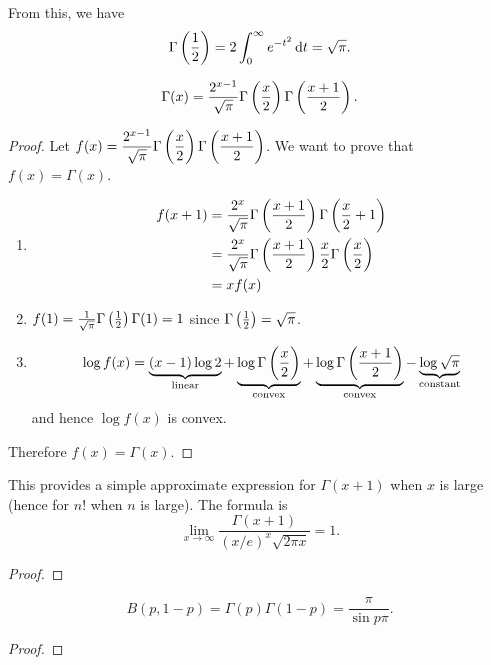 From this, we have
\[\Gamma\left(\frac{1}{2}\right)=2\int_0^\infty e^{-t^2}\dd{t=\sqrt{\pi}.}\]

\begin{lemma}
\[\Gamma(x)=\frac{2^{x-1}}{\sqrt{\pi}}\Gamma\left(\frac{x}{2}\right)\Gamma\left(\frac{x+1}{2}\right).\]
\end{lemma}

\begin{proof}
Let $\displaystyle f(x)=\frac{2^{x-1}}{\sqrt{\pi}}\Gamma\left(\frac{x}{2}\right)\Gamma\left(\frac{x+1}{2}\right)$. We want to prove that $f(x)=\Gamma(x)$.
\begin{enumerate}[label=(\roman*)]
\item \begin{align*}
f(x+1)&=\frac{2^x}{\sqrt{\pi}}\Gamma\left(\frac{x+1}{2}\right)\Gamma\left(\frac{x}{2}+1\right)\\
&=\frac{2^x}{\sqrt{\pi}}\Gamma\left(\frac{x+1}{2}\right)\frac{x}{2}\Gamma\left(\frac{x}{2}\right)\\
&=xf(x)
\end{align*}
\item $f(1)=\frac{1}{\sqrt{\pi}}\Gamma\left(\frac{1}{2}\right)\Gamma(1)=1$ since $\Gamma\left(\frac{1}{2}\right)=\sqrt{\pi}$.
\item \[\log f(x)=\underbrace{(x-1)\log2}_\text{linear}+\underbrace{\log\Gamma\left(\frac{x}{2}\right)}_\text{convex}+\underbrace{\log\Gamma\left(\frac{x+1}{2}\right)}_\text{convex}-\underbrace{\log\sqrt{\pi}}_\text{constant}\]
and hence $\log f(x)$ is convex.
\end{enumerate}
Therefore $f(x)=\Gamma(x)$.
\end{proof}

\begin{theorem}
This provides a simple approximate expression for $\Gamma(x+1)$ when $x$ is large (hence for $n!$ when $n$ is large). The formula is
\begin{equation}
\lim_{x\to\infty}\frac{\Gamma(x+1)}{(x/e)^x\sqrt{2\pi x}}=1.
\end{equation}
\end{theorem}

\begin{proof}

\end{proof}

\begin{lemma}
\[B(p,1-p)=\Gamma(p)\Gamma(1-p)=\frac{\pi}{\sin p\pi}.\]
\end{lemma}

\begin{proof}

\end{proof}